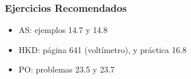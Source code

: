 \subsubsection{Ejercicios Recomendados}
\label{sec:orgc1d6688}
\begin{itemize}
\item AS: ejemplos 14.7 y 14.8
\item HKD: página 641 (voltímetro), y práctica 16.8
\item PO: problemas 23.5 y 23.7
\end{itemize}

